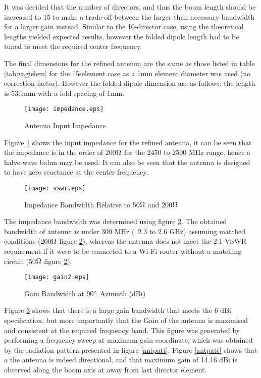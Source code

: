 \documentclass[10pt,twocolumn,hidelinks]{witseiepaper}
\begin{document}
It was decided that the number of directors, and thus the boom length
should be increased to 15 to make a trade-off between the larger than
necessary bandwidth for a larger gain instead. Similar to the 10-director
case, using the theoretical lengths yielded expected results, however the
folded dipole length had to be tuned to meet the required center frequency.

The final dimensions for the refined antenna are the same as those listed
in table \ref{tab:yagielem} for the 15-element case as a 1mm element
diameter was used (no correction factor). However the folded dipole
dimension are as follows: the length is 53.1mm with a fold spacing of 1mm.

\begin{figure}
    \texttt{[image: impedance.eps]}
    \caption{Antenna Input Impedance}
    \label{impedance}
    \vspace{-0.3cm}
\end{figure}

Figure \ref{impedance} shows the input impedance for the refined antenna,
it can be seen that the impedance is in the order of 200$\ohm$ for the 2450
to 2500 MHz range, hence a halve wave balun may be used. It can also be
seen that the antenna is designed to have zero reactance at the center
frequency.
\begin{figure}
    \texttt{[image: vswr.eps]}
    \vspace{-0.1cm}
    \caption{Impedance Bandwidth Relative to 50$\ohm$ and 200$\ohm$}
    \label{vswr}
    \vspace{-0.35cm}
\end{figure}

The impedance bandwidth was determined using figure \ref{vswr}. The
obtained bandwidth of antenna is under 300 MHz (~2.3 to 2.6 GHz) assuming
matched conditions (200$\ohm$ figure \ref{vswr}), whereas the antenna does
not meet the 2:1 VSWR requirement if it were to be connected to a Wi-Fi
router without a matching circuit (50$\ohm$ figure \ref{vswr}).
\begin{figure}
    \texttt{[image: gain2.eps]}
    \caption{Gain Bandwidth at 90$\degree$ Azimuth (dBi)}
    \label{gainbw}
    \vspace{-0.35cm}
\end{figure}

Figure \ref{gainbw} shows that there is a large gain bandwidth that meets
the 6 dBi specification, but more importantly that the Gain of the antenna
is maximised and consistent at the required frequency band. This figure was
generated by performing a frequency sweep at maximum gain coordinate, which
was obtained by the radiation pattern presented in figure \ref{antpatt}.
Figure \ref{antpatt} shows that a the antenna is indeed directional, and
that maximum gain of 14.16 dBi is observed along the boom axis at away from
last director element.
\end{document}
